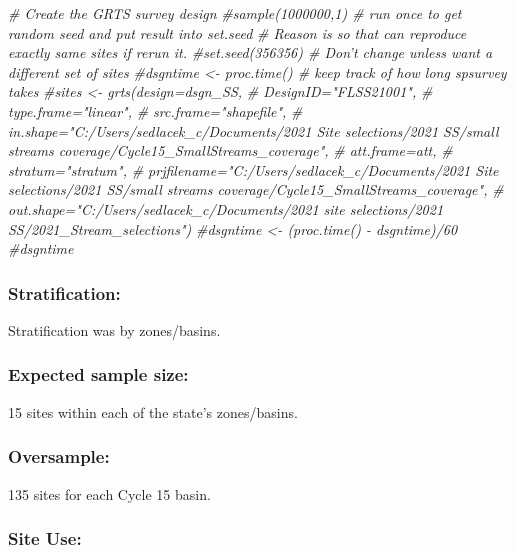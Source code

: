 \documentclass[
]{article}
\newenvironment{Shaded}{\begin{snugshade}}{\end{snugshade}}
\newcommand{\CommentTok}[1]{\textcolor[rgb]{0.56,0.35,0.01}{\textit{#1}}}
\begin{document}
\begin{Shaded}
\begin{Highlighting}[]
\CommentTok{# Create the GRTS survey design}
\CommentTok{#sample(1000000,1) # run once to get random seed and put result into set.seed}
\CommentTok{# Reason is so that can reproduce exactly same sites if rerun it.}
\CommentTok{#set.seed(356356)  # Don't change unless want a different set of sites}
\CommentTok{#dsgntime <- proc.time()  # keep track of how long spsurvey takes}
\CommentTok{#sites <- grts(design=dsgn_SS,}
\CommentTok{#              DesignID="FLSS21001",}
\CommentTok{#              type.frame="linear",}
\CommentTok{#              src.frame="shapefile",}
\CommentTok{#              in.shape="C:/Users/sedlacek_c/Documents/2021 Site selections/2021 SS/small streams coverage/Cycle15_SmallStreams_coverage",}
\CommentTok{#              att.frame=att,}
\CommentTok{#              stratum="stratum",}
\CommentTok{#              prjfilename="C:/Users/sedlacek_c/Documents/2021 Site selections/2021 SS/small streams coverage/Cycle15_SmallStreams_coverage",}
\CommentTok{#              out.shape="C:/Users/sedlacek_c/Documents/2021 site selections/2021 SS/2021_Stream_selections")}
\CommentTok{#dsgntime <- (proc.time() - dsgntime)/60}
\CommentTok{#dsgntime}
\end{Highlighting}
\end{Shaded}

\hypertarget{stratification}{%
\subsubsection{\texorpdfstring{\textbf{Stratification:}}{Stratification:}}\label{stratification}}

Stratification was by zones/basins.

\hypertarget{expected-sample-size}{%
\subsubsection{\texorpdfstring{\textbf{Expected sample
size:}}{Expected sample size:}}\label{expected-sample-size}}

15 sites within each of the state's zones/basins.

\hypertarget{oversample}{%
\subsubsection{\texorpdfstring{\textbf{Oversample:}}{Oversample:}}\label{oversample}}

135 sites for each Cycle 15 basin.

\hypertarget{site-use}{%
\subsubsection{\texorpdfstring{\textbf{Site
Use:}}{Site Use:}}\label{site-use}}
\end{document}
